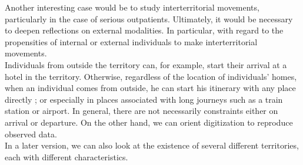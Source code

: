 Another interesting case would be to study interterritorial movements, particularly in the case of serious outpatients. Ultimately, it would be necessary to deepen reflections on external modalities. In particular, with regard to the propensities of internal or external individuals to make interterritorial movements.\\

Individuals from outside the territory can, for example, start their arrival at a hotel in the territory. Otherwise, regardless of the location of individuals' homes, when an individual comes from outside, he can start his itinerary with any place directly ; or especially in places associated with long journeys such as a train station or airport. In general, there are not necessarily constraints either on arrival or departure. On the other hand, we can orient digitization to reproduce observed data.\\

In a later version, we can also look at the existence of several different territories, each with different characteristics.